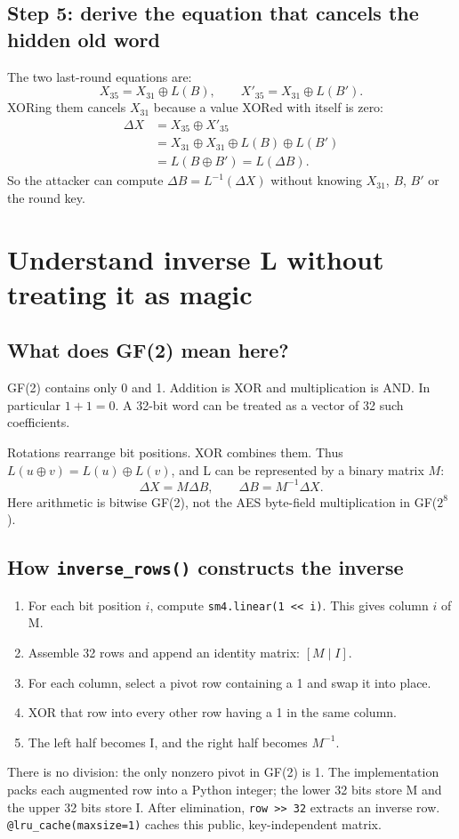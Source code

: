 \documentclass[11pt,a4paper]{report}
\newcommand{\xor}{\mathbin{\oplus}}
\begin{document}
\section{Step 5: derive the equation that cancels the hidden old word}
The two last-round equations are:
\[X_{35}=X_{31}\xor L(B),\qquad X'_{35}=X_{31}\xor L(B').\]
XORing them cancels \(X_{31}\) because a value XORed with itself is zero:
\begin{align*}
\Delta X&=X_{35}\xor X'_{35}\\
&=X_{31}\xor X_{31}\xor L(B)\xor L(B')\\
&=L(B\xor B')=L(\Delta B).
\end{align*}
So the attacker can compute \(\Delta B=L^{-1}(\Delta X)\) without knowing \(X_{31}\), \(B\), \(B'\) or the round key.

\chapter{Understand inverse L without treating it as magic}
\section{What does GF(2) mean here?}
GF(2) contains only 0 and 1. Addition is XOR and multiplication is AND. In particular \(1+1=0\). A 32-bit word can be treated as a vector of 32 such coefficients.

Rotations rearrange bit positions. XOR combines them. Thus \(L(u\xor v)=L(u)\xor L(v)\), and L can be represented by a binary matrix \(M\):
\[\Delta X=M\Delta B,\qquad\Delta B=M^{-1}\Delta X.\]
Here arithmetic is bitwise GF(2), not the AES byte-field multiplication in GF(\(2^8\)).

\section{How \texttt{inverse\_rows()} constructs the inverse}
\begin{enumerate}
\item For each bit position \(i\), compute \texttt{sm4.linear(1 << i)}. This gives column \(i\) of M.
\item Assemble 32 rows and append an identity matrix: \([M\mid I]\).
\item For each column, select a pivot row containing a 1 and swap it into place.
\item XOR that row into every other row having a 1 in the same column.
\item The left half becomes I, and the right half becomes \(M^{-1}\).
\end{enumerate}
There is no division: the only nonzero pivot in GF(2) is 1. The implementation packs each augmented row into a Python integer; the lower 32 bits store M and the upper 32 bits store I. After elimination, \texttt{row >> 32} extracts an inverse row. \texttt{@lru\_cache(maxsize=1)} caches this public, key-independent matrix.
\end{document}
